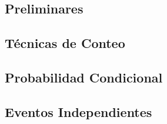 \documentclass[../main.tex]{subfiles}
\begin{document}
\subsection{Preliminares}

\clearpage

\subsection{Técnicas de Conteo}

\clearpage

\subsection{Probabilidad Condicional}

\clearpage

\subsection{Eventos Independientes}

\clearpage
\end{document}
